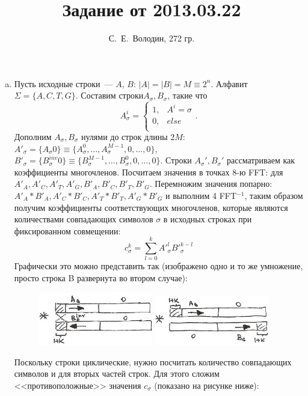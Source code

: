 \documentclass[a4paper]{article}
\title{Задание от 2013.03.22}
\author{С.~Е.~Володин, 272 гр.}
\date{}
\begin{document}
\maketitle
\begin{enumerate}[(a)]
\item Пусть исходные строки~--- $A$, $B$: $|A|=|B|=M\equiv 2^n$. Алфавит $\Sigma=\{A,C,T,G\}$. Составим строки$A_\sigma, B_\sigma$, такие что $$A^{i}_\sigma=\left\{\begin{array}{lcr}1, & A^i=\sigma\\ 0, & else\\ \end{array}. \right.$$ Дополним $A_\sigma,B_\sigma$ нулями до строк длины $2M$:\newline
$A'_\sigma=\{A_\sigma 0\}\equiv\{A^{0}_\sigma,\dots,A^{M-1}_\sigma,0,\dots,0\}$,\newline$B'_\sigma=\{B^{inv}_\sigma 0\}\equiv\{B^{M-1}_\sigma,\dots,B^{0}_\sigma,0,\dots,0\}$.\newline
Строки $A_\sigma',B_\sigma'$ рассматриваем как коэффициенты многочленов.\newline
Посчитаем значения в точках 8-ю FFT: для $A'_A,A'_C,A'_T,A'_G,B'_A,B'_C,B'_T,B'_G$.
Перемножим значения попарно: $A'_A*B'_A,A'_C*B'_C,A'_T*B'_T,A'_G*B'_G$ и выполним 4 FFT$^{-1}$, таким образом получим коэффициенты соответствующих многочленов, которые являются количествами совпадающих символов $\sigma$ в исходных строках при фиксированном совмещении:\newline
$$c^k_\sigma=\sum\limits_{l=0}^{k} A'^l_\sigma B'^{k-l}_\sigma$$
Графически это можно представить так (изображено одно и то же умножение, просто строка B развернута во втором случае):
\begin{figure}[hr]
	\includegraphics[width=5cm]{1.jpg}
	\includegraphics[width=5cm]{2.jpg}
\end{figure}\newline
Поскольку строки циклические, нужно посчитать количество совпадающих символов и для вторых частей строк. Для этого сложим <<противоположные>> значения $c_\sigma$ (показано на рисунке ниже):

\end{enumerate}
\end{document}
